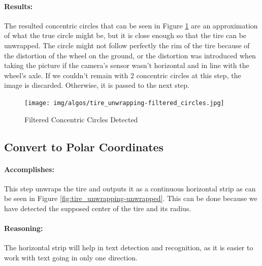 \paragraph*{Results:}\mbox{}\par
The resulted concentric circles that can be seen in Figure \ref{fig:Hough_Circles_Transform-filtered_circles} are an approximation of what the true circle might be, but it is close enough so that the tire can be unwrapped. The circle might not follow perfectly the rim of the tire because of the distortion of the wheel on the ground, or the distortion was introduced when taking the picture if the camera's sensor wasn't horizontal and in line with the wheel's axle. If we couldn't remain with 2 concentric circles at this step, the image is discarded. Otherwise, it is passed to the next step.

\begin{figure}
    \centering
    \texttt{[image: img/algos/tire\_unwrapping-filtered\_circles.jpg]}
    \caption{Filtered Concentric Circles Detected}
    \label{fig:Hough_Circles_Transform-filtered_circles}
\end{figure}

\subsection{Convert to Polar Coordinates}
\label{subsec:convert_to_polar}

\paragraph*{Accomplishes:}\mbox{}\par
This step unwraps the tire and outputs it as a continuous horizontal strip as can be seen in Figure \ref{fig:tire_unwrapping-unwrapped}. This can be done because we have detected the supposed center of the tire and its radius.

\paragraph*{Reasoning:}\mbox{}\par
The horizontal strip will help in text detection and recognition, as it is easier to work with text going in only one direction.


